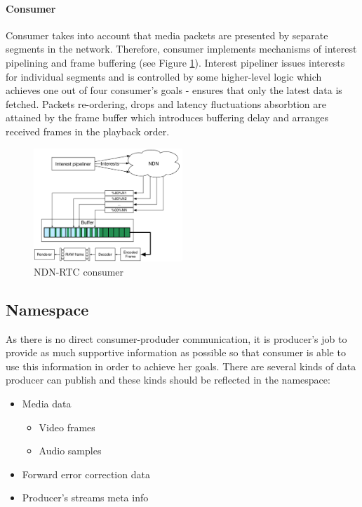 \documentclass[10pt]{proc}
\begin{document}
\paragraph{Consumer}

Consumer takes into account that media packets are presented by separate segments in the network. Therefore, consumer implements mechanisms of interest pipelining and frame buffering (see Figure \ref{fig:consumer}). Interest pipeliner issues interests for individual segments and is controlled by some higher-level logic which achieves one out of four consumer's goals - ensures that only the latest data is fetched. Packets re-ordering, drops and latency fluctuations absorbtion are attained by the frame buffer which introduces buffering delay and arranges received frames in the playback order.

\begin{figure}[Ht!]
\centering
\includegraphics[width=0.5\textwidth]{consumer}
\caption{NDN-RTC consumer}
\label{fig:consumer}
\end{figure}


\subsection{Namespace}

As there is no direct consumer-produder communication, it is producer's job to provide as much supportive information as possible so that consumer is able to use this information in order to achieve her goals. There are several kinds of data producer can publish and these kinds should be reflected in the namespace:

\begin{itemize}
\item Media data
\begin{itemize}
\item Video frames
\item Audio samples
\end{itemize}
\item Forward error correction data
\item Producer's streams meta info
\end{itemize}
\end{document}
